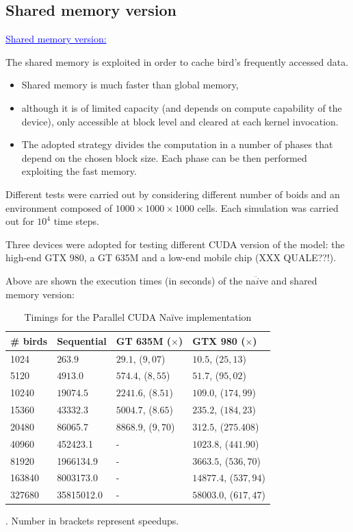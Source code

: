 \documentclass{beamer}
\begin{document}
\subsection{Shared memory version}
\begin{frame}
\textcolor{blue}{\underline{Shared memory version:}}

The shared memory is exploited in order to cache
bird's frequently accessed data.
\begin{itemize}
\item Shared memory is much faster than global memory,
\item although it is of limited capacity (and
depends on compute capability of the device), only accessible at block level and cleared at
each kernel invocation.
\item The adopted strategy divides the computation in a number
of phases that depend on the chosen block size. Each phase
can be then performed exploiting the fast memory.
\end{itemize} 
Different tests were carried out  by considering
different number of boids and an environment composed of
$1000 \times 1000 \times 1000$ cells. Each simulation was carried out for
$10^4$ time steps.
\end{frame}
\begin{frame}
Three devices were adopted for testing different CUDA
version of the model: the high-end GTX 980, a GT 635M
and a low-end mobile chip (XXX QUALE??!).

Above are shown the execution times (in seconds) of the na$\ddot{i}$ve and shared memory version:

\begin{table} [h!]
	\centering
		\begin{tabular}{|l |l |l| l|}
	\hline
	\# birds & Sequential & GT	635M ($\times$) & GTX 980 ($\times$) 
	\\
	\hline
	
	1024  	& \(263.9\) 	& $29.1$, ($9,07$) 	& $10.5$, ($25,13$) \\
	5120  	& \(4913.0\) 	& $574.4$, ($8,55$) 	& $51.7$, ($95,02$)  \\
	10240 	&  $19074.5$ 	& $2241.6$, ($8.51$) 	& $109.0$, ($174,99$)  \\
	15360 	& \(43332.3\) 	& $5004.7$, ($8.65$) 	& $235.2$, ($184,23$)  \\
	20480  	& 86065.7 		& $8868.9$, ($9,70$) 	& $312.5$, ($275.408$) \\
	40960  	& 452423.1 		& - 						& $1023.8$, ($441.90$)  \\
	81920  	& 1966134.9 	& - 						& $3663.5$, ($536,70$)  \\
	163840  & 8003173.0 	& - 						& $14877.4$, ($537,94$)	 \\
	327680  & 35815012.0 	& - 						& $58003.0$, ($617,47$)  \\
	\hline
	\end{tabular}
	\caption{Timings for the Parallel CUDA Na\"ive implementation}. Number in brackets represent speedups.
	\label{tab:naive}
\end{table}
\end{frame}
\end{document}
